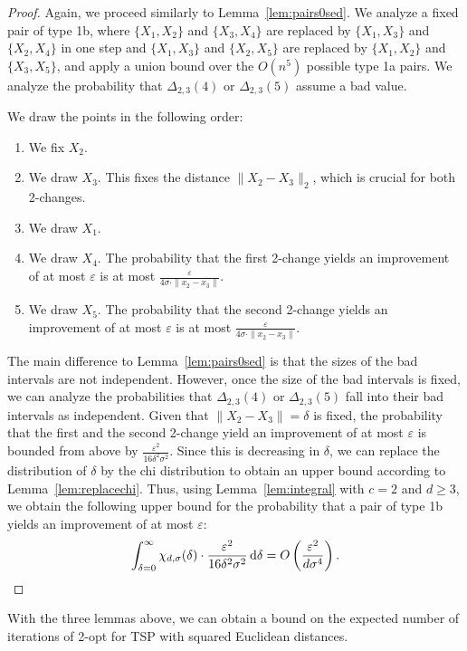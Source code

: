 \documentclass[11pt,DIV=12,a4paper]{scrartcl}
\newcommand{\edge}[2]{\ensuremath{\{X_{#1}, X_{#2}\}}}
\newcommand{\eps}{\varepsilon}
\begin{document}
\begin{proof}
Again, we proceed similarly to Lemma~\ref{lem:pairs0sed}. We analyze a fixed pair of type 1b, where $\edge 12$ and $\edge 34$
are replaced by $\edge 13$ and $\edge 24$ in one step and $\edge 13$ and $\edge 25$ are replaced by $\edge 12$ and $\edge 35$,
and apply a union bound over the $O(n^5)$ possible type 1a pairs. We analyze the probability that $\Delta_{2,3}(4)$ or
$\Delta_{2,3}(5)$ assume a bad value.

We draw the points in the following order:
\begin{enumerate}[label=\arabic{*}.]
\item We fix $X_2$.
\item We draw $X_3$. This fixes the distance $\|X_2 - X_3\|_2$, which is crucial for both 2-changes.
\item We draw $X_1$.
\item We draw $X_4$. The probability that the first 2-change yields an improvement of at most $\eps$ is at most $\frac{\eps}{4 \sigma \cdot \|x_2 - x_3\|}$.
\item We draw $X_5$. The probability that the second 2-change yields an improvement of at most $\eps$ is at most $\frac{\eps}{4 \sigma \cdot \|x_2 - x_3\|}$.
\end{enumerate}

The main difference to Lemma~\ref{lem:pairs0sed} is that the sizes of the bad intervals are not independent.
However, once the size of the bad intervals is fixed, we can analyze the probabilities that $\Delta_{2,3}(4)$ or $\Delta_{2,3}(5)$
fall into their bad intervals as independent.
Given that $\|X_2 - X_3\| = \delta$ is fixed, the probability that the first and the second 2-change yield an improvement
of at most $\eps$ is bounded from above by $\frac{\eps^2}{16\delta^2\sigma^2}$.
Since this is decreasing in $\delta$, we can replace the distribution of $\delta$ by the chi distribution
to obtain an upper bound according to Lemma~\ref{lem:replacechi}.
Thus, using Lemma~\ref{lem:integral} with $c=2$ and $d \geq 3$, we obtain the following upper bound for the probability that
a pair of type 1b yields an improvement of at most $\eps$:
\[
\int_{\delta = 0}^\infty \chi_{d, \sigma}(\delta) \cdot \frac{\eps^2}{16\delta^2\sigma^2} \,\textup d \delta
 = O\left(\frac{\eps^2}{d\sigma^4}\right).
\]
\end{proof}

With the three lemmas above, we can obtain a bound on the expected number of iterations of 2-opt for TSP with squared Euclidean distances.
\end{document}
